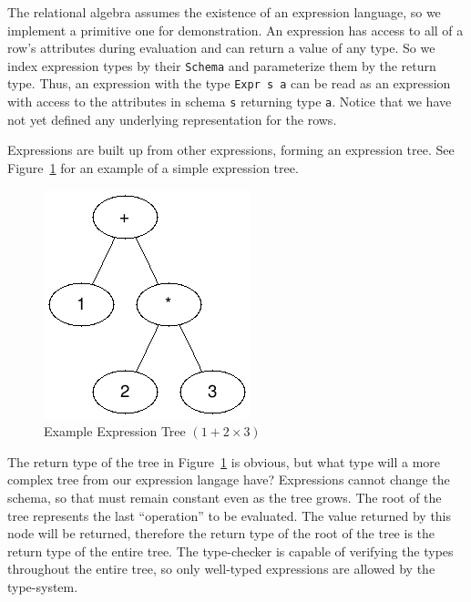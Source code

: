 \documentclass[12pt]{article}
\begin{document}
The relational algebra assumes the existence of an expression language, so we implement a primitive one for demonstration.
An expression has access to all of a row's attributes during evaluation and can return a value of any type.
So we index expression types by their \texttt{Schema} and parameterize them by the return type.
Thus, an expression with the type \texttt{Expr s a} can be read as an expression with access to the attributes in schema \texttt{s} returning type \texttt{a}.
Notice that we have not yet defined any underlying representation for the rows.

Expressions are built up from other expressions, forming an expression tree.
See Figure~\ref{fig:expr_tree} for an example of a simple expression tree.

\begin{figure}[h!]
    \centering
    \includegraphics[width=0.25\linewidth]{assets/expr_tree.png}
    \caption{Example Expression Tree $(1 + 2 \times 3)$}
    \label{fig:expr_tree}
\end{figure}

The return type of the tree in Figure~\ref{fig:expr_tree} is obvious, but what type will a more complex tree from our expression langage have?
Expressions cannot change the schema, so that must remain constant even as the tree grows.
The root of the tree represents the last ``operation'' to be evaluated.
The value returned by this node will be returned, therefore the return type of the root of the tree is the return type of the entire tree.
The type-checker is capable of verifying the types throughout the entire tree, so only well-typed expressions are allowed by the type-system.
\end{document}
